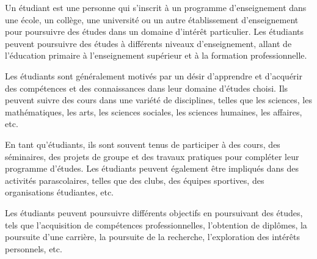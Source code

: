 Un étudiant est une personne qui s'inscrit à un programme d'enseignement dans une école, un collège, une université ou un autre établissement d'enseignement pour poursuivre des études dans un domaine d'intérêt particulier. Les étudiants peuvent poursuivre des études à différents niveaux d'enseignement, allant de l'éducation primaire à l'enseignement supérieur et à la formation professionnelle.

Les étudiants sont généralement motivés par un désir d'apprendre et d'acquérir des compétences et des connaissances dans leur domaine d'études choisi. Ils peuvent suivre des cours dans une variété de disciplines, telles que les sciences, les mathématiques, les arts, les sciences sociales, les sciences humaines, les affaires, etc.

En tant qu'étudiants, ils sont souvent tenus de participer à des cours, des séminaires, des projets de groupe et des travaux pratiques pour compléter leur programme d'études. Les étudiants peuvent également être impliqués dans des activités parascolaires, telles que des clubs, des équipes sportives, des organisations étudiantes, etc.

Les étudiants peuvent poursuivre différents objectifs en poursuivant des études, tels que l'acquisition de compétences professionnelles, l'obtention de diplômes, la poursuite d'une carrière, la poursuite de la recherche, l'exploration des intérêts personnels, etc.
